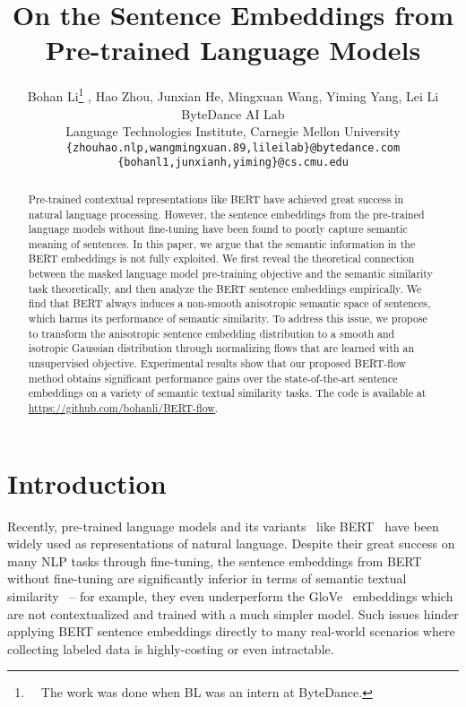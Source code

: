 \documentclass[11pt,a4paper]{article}
\title{On the Sentence Embeddings from Pre-trained Language Models}
\author{Bohan Li\thanks{\ \ The work was done when BL was an intern at ByteDance.} , 
Hao Zhou, 
Junxian He, 
Mingxuan Wang, 
Yiming Yang, 
Lei Li \\
  ByteDance AI Lab \\
  Language Technologies Institute, Carnegie Mellon University \\
  {\texttt{\{zhouhao.nlp,wangmingxuan.89,lileilab\}@bytedance.com}} \\
  {\texttt{\{bohanl1,junxianh,yiming\}@cs.cmu.edu}}
  }
\date{}
\begin{document}
\maketitle

\begin{abstract}
Pre-trained contextual representations like BERT have achieved great success in natural language processing. 
However, the sentence embeddings from the pre-trained language models without fine-tuning have been found to poorly capture semantic meaning of sentences. 
In this paper, we argue that the semantic information in the BERT embeddings is not fully exploited. 
We first reveal the theoretical connection between the masked language model pre-training objective and the semantic similarity task theoretically, and then analyze the BERT sentence embeddings empirically. We find that BERT always induces a non-smooth anisotropic semantic space of sentences, which harms its performance of semantic similarity. To address this issue, we propose to transform the anisotropic sentence embedding distribution to a smooth and isotropic Gaussian distribution through normalizing flows that are learned with an unsupervised objective. Experimental results show that our proposed BERT-flow method obtains significant performance gains over the state-of-the-art sentence embeddings on a variety of semantic textual similarity tasks.
The code is available at \url{https://github.com/bohanli/BERT-flow}.

\end{abstract}
 \section{Introduction}
\label{sec:intro}
Recently, pre-trained language models and its variants~\citep{radford2019language,devlin2018bert,yang2019xlnet,liu2019roberta} like BERT~\citep{devlin2018bert} have been widely used as representations of natural language. Despite their great success on many NLP tasks through fine-tuning, the sentence embeddings from BERT without fine-tuning are significantly inferior in terms of semantic textual similarity~\citep{reimers2019sentence} -- for example, they even underperform the GloVe~\citep{pennington2014glove} embeddings which are not contextualized and trained with a much simpler model. Such issues hinder applying BERT sentence embeddings directly to many real-world scenarios where collecting labeled data is highly-costing or even intractable.
\end{document}
